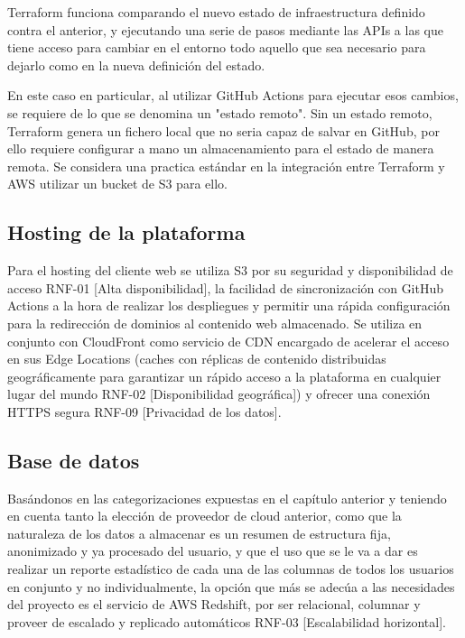 Terraform funciona comparando el nuevo estado de infraestructura definido contra el anterior, y ejecutando una serie de pasos mediante las APIs a las que tiene acceso para cambiar en el entorno todo aquello que sea necesario para dejarlo como en la nueva definición del estado.

En este caso en particular, al utilizar GitHub Actions para ejecutar esos cambios, se requiere de lo que se denomina un "estado remoto". Sin un estado remoto, Terraform genera un fichero local que no seria capaz de salvar en GitHub, por ello requiere configurar a mano un almacenamiento para el estado de manera remota. Se considera una practica estándar en la integración entre Terraform y AWS utilizar un bucket de S3 para ello.

\subsection{Hosting de la plataforma}

Para el hosting del cliente web se utiliza S3 por su seguridad y disponibilidad de acceso RNF-01 [Alta disponibilidad], la facilidad de sincronización con GitHub Actions a la hora de realizar los despliegues y permitir una rápida configuración para la redirección de dominios al contenido web almacenado. Se utiliza en conjunto con CloudFront como servicio de CDN encargado de acelerar el acceso en sus Edge Locations (caches con réplicas de contenido distribuidas geográficamente para garantizar un rápido acceso a la plataforma en cualquier lugar del mundo RNF-02 [Disponibilidad geográfica]) y ofrecer una conexión HTTPS segura RNF-09 [Privacidad de los datos].

\subsection{Base de datos}

Basándonos en las categorizaciones expuestas en el capítulo anterior y teniendo en cuenta tanto la elección de proveedor de cloud anterior, como que la naturaleza de los datos a almacenar es un resumen de estructura fija, anonimizado y ya procesado del usuario, y que el uso que se le va a dar es realizar un reporte estadístico de cada una de las columnas de todos los usuarios en conjunto y no individualmente, la opción que más se adecúa a las necesidades del proyecto es el servicio de AWS Redshift, por ser relacional, columnar y proveer de escalado y replicado automáticos RNF-03 [Escalabilidad horizontal].

